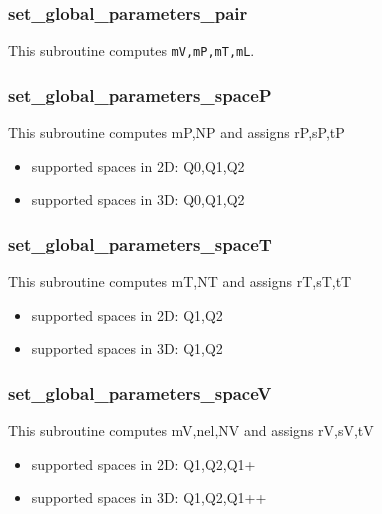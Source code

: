  \subsubsection{set\_global\_parameters\_pair}
 This subroutine computes {\tt mV,mP,mT,mL}.
 \subsubsection{set\_global\_parameters\_spaceP}
 This subroutine computes mP,NP and assigns rP,sP,tP
 \begin{itemize}
 \item supported spaces in 2D: Q0,Q1,Q2
 \item supported spaces in 3D: Q0,Q1,Q2
 \end{itemize}
 \subsubsection{set\_global\_parameters\_spaceT}
 This subroutine computes mT,NT and assigns rT,sT,tT
 \begin{itemize}
 \item supported spaces in 2D: Q1,Q2
 \item supported spaces in 3D: Q1,Q2
 \end{itemize}
 \subsubsection{set\_global\_parameters\_spaceV}
 This subroutine computes mV,nel,NV and assigns rV,sV,tV
 \begin{itemize}
 \item supported spaces in 2D: Q1,Q2,Q1+
 \item supported spaces in 3D: Q1,Q2,Q1++
 \end{itemize}
